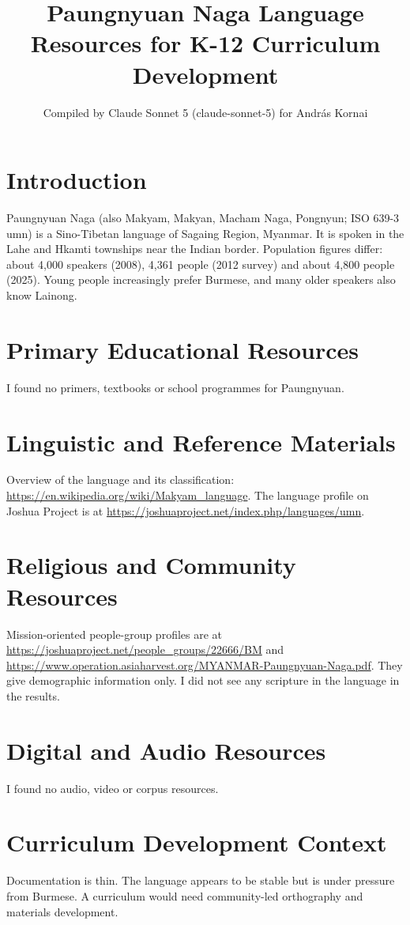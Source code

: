 \documentclass[12pt]{article}
\title{Paungnyuan Naga Language Resources for K-12 Curriculum Development}
\author{Compiled by Claude Sonnet 5 (claude-sonnet-5) for Andr\'as Kornai}
\date{}
\begin{document}
\maketitle
\section{Introduction}
Paungnyuan Naga (also Makyam, Makyan, Macham Naga, Pongnyun; ISO 639-3 umn) is a Sino-Tibetan language of Sagaing Region, Myanmar. It is spoken in the Lahe and Hkamti townships near the Indian border. Population figures differ: about 4,000 speakers (2008), 4,361 people (2012 survey) and about 4,800 people (2025). Young people increasingly prefer Burmese, and many older speakers also know Lainong.
\section{Primary Educational Resources}
I found no primers, textbooks or school programmes for Paungnyuan.
\section{Linguistic and Reference Materials}
Overview of the language and its classification: \url{https://en.wikipedia.org/wiki/Makyam_language}. The language profile on Joshua Project is at \url{https://joshuaproject.net/index.php/languages/umn}.
\section{Religious and Community Resources}
Mission-oriented people-group profiles are at \url{https://joshuaproject.net/people_groups/22666/BM} and \url{https://www.operation.asiaharvest.org/MYANMAR-Paungnyuan-Naga.pdf}. They give demographic information only. I did not see any scripture in the language in the results.
\section{Digital and Audio Resources}
I found no audio, video or corpus resources.
\section{Curriculum Development Context}
Documentation is thin. The language appears to be stable but is under pressure from Burmese. A curriculum would need community-led orthography and materials development.
\end{document}
